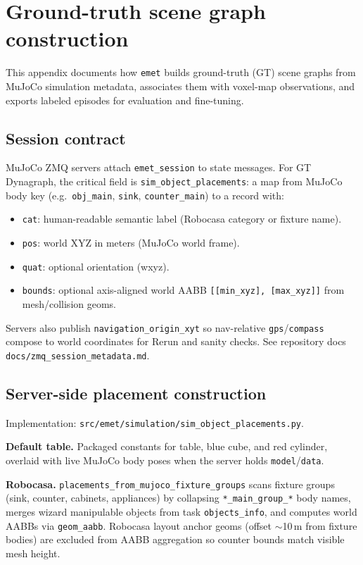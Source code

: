 \section{Ground-truth scene graph construction}
\label{app:ground_truth_graph}

This appendix documents how \texttt{emet} builds ground-truth (GT) scene graphs from MuJoCo simulation metadata, associates them with voxel-map observations, and exports labeled episodes for evaluation and fine-tuning.

\subsection{Session contract}

MuJoCo ZMQ servers attach \texttt{emet\_session} to state messages.
For GT Dynagraph, the critical field is \texttt{sim\_object\_placements}: a map from MuJoCo body key (e.g.\ \texttt{obj\_main}, \texttt{sink}, \texttt{counter\_main}) to a record with:
\begin{itemize}
  \item \texttt{cat}: human-readable semantic label (Robocasa category or fixture name).
  \item \texttt{pos}: world XYZ in meters (MuJoCo world frame).
  \item \texttt{quat}: optional orientation (wxyz).
  \item \texttt{bounds}: optional axis-aligned world AABB \texttt{[[min\_xyz], [max\_xyz]]} from mesh/collision geoms.
\end{itemize}
Servers also publish \texttt{navigation\_origin\_xyt} so nav-relative \texttt{gps}/\texttt{compass} compose to world coordinates for Rerun and sanity checks.
See repository docs \texttt{docs/zmq\_session\_metadata.md}.

\subsection{Server-side placement construction}

Implementation: \texttt{src/emet/simulation/sim\_object\_placements.py}.

\textbf{Default table.} Packaged constants for table, blue cube, and red cylinder, overlaid with live MuJoCo body poses when the server holds \texttt{model}/\texttt{data}.

\textbf{Robocasa.} \texttt{placements\_from\_mujoco\_fixture\_groups} scans fixture groups (sink, counter, cabinets, appliances) by collapsing \texttt{*\_main\_group\_*} body names, merges wizard manipulable objects from task \texttt{objects\_info}, and computes world AABBs via \texttt{geom\_aabb}.
Robocasa layout anchor geoms (offset ${\sim}$10\,m from fixture bodies) are excluded from AABB aggregation so counter bounds match visible mesh height.

